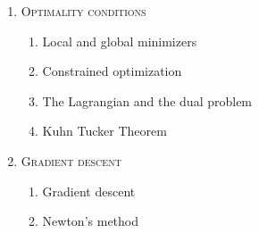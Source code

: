 \begin{enumerate}[label=\textbf{\arabic*.}]
\begin{enumerate}[label=\arabic*.,noitemsep]
\end{enumerate}
\item \textsc{Optimality conditions}
\vspace{-0.2cm}
\begin{enumerate}[label=\arabic*.,noitemsep]
\item Local and global minimizers
\item Constrained optimization
\item The Lagrangian and the dual problem
\item Kuhn Tucker Theorem
\end{enumerate}
\item \textsc{Gradient descent}
\vspace{-0.2cm}
\begin{enumerate}[label=\arabic*.,noitemsep]
\item Gradient descent
\item Newton's method
\end{enumerate}
\end{enumerate}
